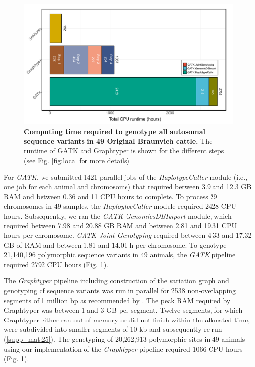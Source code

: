 \documentclass[../main.tex]{subfiles}
\begin{document}
\begin{figure}[!htb]
    \centering
    \includegraphics[width=\textwidth]{paper1/main_figure/Figure4.pdf}
    \caption[Computing time required for genotyping]{\textbf{Computing time required to genotype all autosomal sequence variants in 49 Original Braunvieh cattle.} The runtime of GATK and Graphtyper is shown for the different steps (see Fig. \ref{fig:loca} for more details)}
    \label{fig:varresource}
\end{figure}

For \emph{GATK}, we submitted 1421 parallel jobs of the \emph{HaplotypeCaller} module (i.e., one job for each animal and chromosome) that required between 3.9 and 12.3 GB RAM and between 0.36 and 11 CPU hours to complete.
To process 29 chromosomes in 49 samples, the \emph{HaploytpeCaller} module required 2428 CPU hours. 
Subsequently, we ran the \emph{GATK GenomicsDBImport} module, which required between 7.98 and 20.88 GB RAM and between 2.81 and 19.31 CPU hours per chromosome. 
\emph{GATK Joint Genotyping} required between 4.33 and 17.32 GB of RAM and between 1.81 and 14.01 h per chromosome. 
To genotype 21,140,196 polymorphic sequence variants in 49 animals, the \emph{GATK} pipeline required 2792 CPU hours (Fig. \ref{fig:varresource}).

The \emph{Graphtyper} pipeline including construction of the variation graph and genotyping of sequence variants was run in parallel for 2538 non-overlapping segments of 1 million bp as recommended by \citep{eggertsson2017graphtyper}. 
The peak RAM required by Graphtyper was between 1 and 3 GB per segment. 
Twelve segments, for which Graphtyper either ran out of memory or did not finish within the allocated time, were subdivided into smaller segments of 10 kb and subsequently re-run (\ref{supp_mat:25}).
The genotyping of 20,262,913 polymorphic sites in 49 animals using our implementation of the \emph{Graphtyper} pipeline required 1066 CPU hours (Fig. \ref{fig:varresource}).
\end{document}
